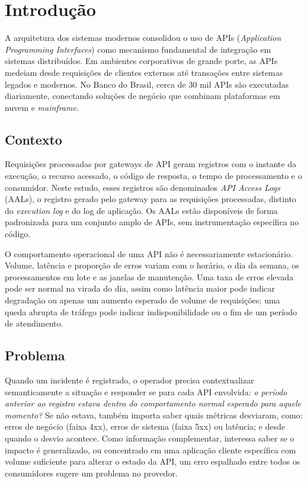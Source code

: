 \documentclass[sigconf,nonacm]{acmart}
\begin{document}
\section{Introdução}

A arquitetura dos sistemas modernos consolidou o uso de APIs (\emph{Application Programming Interfaces}) como mecanismo fundamental de integração em sistemas distribuídos. Em ambientes corporativos de grande porte, as APIs medeiam desde requisições de clientes externos até transações entre sistemas legados e modernos. No Banco do Brasil, cerca de 30 mil APIs são executadas diariamente, conectando soluções de negócio que combinam plataformas em nuvem e \emph{mainframe}.

\subsection{Contexto}

Requisições processadas por gateways de API geram registros com o instante da execução, o recurso acessado, o código de resposta, o tempo de processamento e o consumidor. Neste estudo, esses registros são denominados \emph{API Access Logs} (AALs), o registro gerado pelo gateway para as requisições processadas, distinto do \emph{execution log} e do log de aplicação. Os AALs estão disponíveis de forma padronizada para um conjunto amplo de APIs, sem instrumentação específica no código.

O comportamento operacional de uma API não é necessariamente estacionário. Volume, latência e proporção de erros variam com o horário, o dia da semana, os processamentos em lote e as janelas de manutenção. Uma taxa de erros elevada pode ser normal na virada do dia, assim como latência maior pode indicar degradação ou apenas um aumento esperado de volume de requisições; uma queda abrupta de tráfego pode indicar indisponibilidade ou o fim de um período de atendimento.

\subsection{Problema}
Quando um incidente é registrado, o operador precisa contextualizar semanticamente a situação e responder se para cada API envolvida: \emph{o período anterior ao registro estava dentro do comportamento normal esperado para aquele momento?} Se não estava, também importa saber quais métricas desviaram, como: erros de negócio (faixa 4xx), erros de sistema (faixa 5xx) ou latência; e desde quando o desvio acontece. Como informação complementar, interessa saber se o impacto é generalizado, ou concentrado em uma aplicação cliente específica com volume suficiente para alterar o estado da API, um erro espalhado entre todos os consumidores sugere um problema no provedor.
\end{document}
